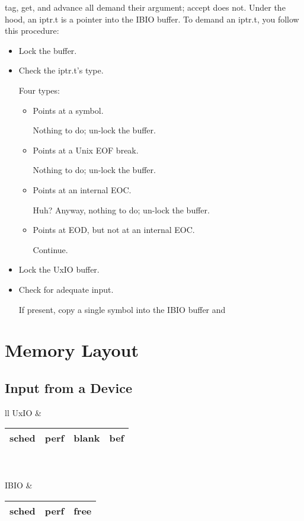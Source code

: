 \documentclass{article}
\begin{document}
\<tag\>, \<get\>, and \<advance\> all demand their argument; \<accept\> does not.
Under the hood, an \<iptr.t\> is a pointer into the IBIO buffer.
To demand an \<iptr.t\>, you follow this procedure:
\begin{itemize}
    \item Lock the buffer.
    \item Check the \<iptr.t\>'s type.
    
    Four types:
    \begin{itemize}
        \item Points at a symbol.
        
        Nothing to do; un-lock the buffer.
        
        \item Points at a Unix EOF break.
        
        Nothing to do; un-lock the buffer.
        
        \item Points at an internal EOC.
        
        Huh?  Anyway, nothing to do; un-lock the buffer.
        
        \item Points at EOD, but not at an internal EOC.
        
        Continue.
    \end{itemize}

    \item Lock the UxIO buffer.
    
    \item Check for adequate input.
    
    If present, copy a single symbol into the IBIO buffer and
\end{itemize}

\section{Memory Layout}

\subsection{Input from a Device}

\begin{tabular}{ll}
    UxIO & \begin{tabular}{|c|c|c|c|}
        \hline
        sched & perf & blank & bef \\
        \hline
    \end{tabular} \\
    \\
    IBIO & \begin{tabular}{|c|c|c|}
        \hline
        sched & perf & free \\
        \hline
    \end{tabular}
\end{tabular}
\end{document}
